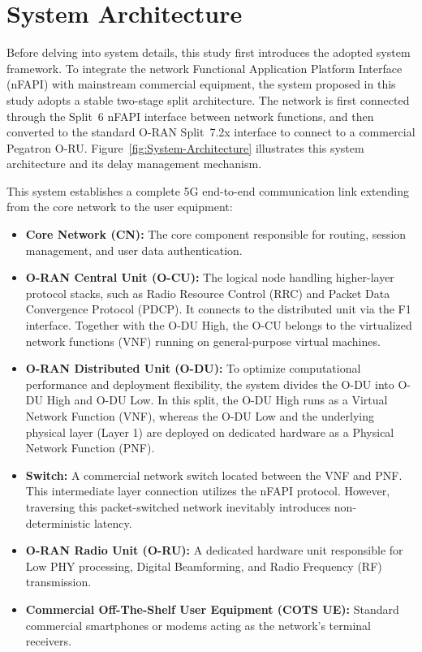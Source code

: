 \documentclass[../my_ntust_thesis.tex]{subfiles}
\begin{document}

\chapter{System Architecture}
\label{sec:system}

Before delving into system details, this study first introduces the adopted system framework. To integrate the network Functional Application Platform Interface (nFAPI) with mainstream commercial equipment, the system proposed in this study adopts a stable two-stage split architecture. The network is first connected through the Split~6 nFAPI interface between network functions, and then converted to the standard O-RAN Split~7.2x interface to connect to a commercial Pegatron O-RU. Figure~\ref{fig:System-Architecture} illustrates this system architecture and its delay management mechanism.

This system establishes a complete 5G end-to-end communication link extending from the core network to the user equipment:
\begin{itemize}
\item \textbf{Core Network (CN):} The core component responsible for routing, session management, and user data authentication.
\item \textbf{O-RAN Central Unit (O-CU):} The logical node handling higher-layer protocol stacks, such as Radio Resource Control (RRC) and Packet Data Convergence Protocol (PDCP). It connects to the distributed unit via the F1 interface. Together with the O-DU High, the O-CU belongs to the virtualized network functions (VNF) running on general-purpose virtual machines.
\item \textbf{O-RAN Distributed Unit (O-DU):} To optimize computational performance and deployment flexibility, the system divides the O-DU into O-DU High and O-DU Low. In this split, the O-DU High runs as a Virtual Network Function (VNF), whereas the O-DU Low and the underlying physical layer (Layer 1) are deployed on dedicated hardware as a Physical Network Function (PNF).
\item \textbf{Switch:} A commercial network switch located between the VNF and PNF. This intermediate layer connection utilizes the nFAPI protocol. However, traversing this packet-switched network inevitably introduces non-deterministic latency.
\item \textbf{O-RAN Radio Unit (O-RU):} A dedicated hardware unit responsible for Low PHY processing, Digital Beamforming, and Radio Frequency (RF) transmission.
\item \textbf{Commercial Off-The-Shelf User Equipment (COTS UE):} Standard commercial smartphones or modems acting as the network's terminal receivers.
\end{itemize}
\end{document}
